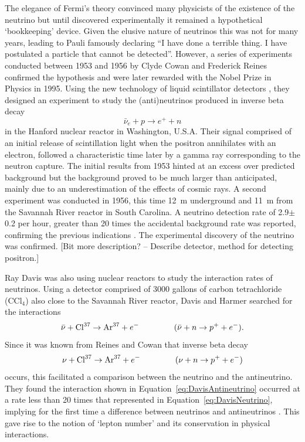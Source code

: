 The elegance of Fermi's theory convinced many physicists of the existence of the neutrino but until discovered experimentally it remained a hypothetical `bookkeeping' device.  Given the elusive nature of neutrinos this was not for many years, leading to Pauli famously declaring ``I have done a terrible thing. I have postulated a particle that cannot be detected''.  However, a series of experiments conducted between 1953 and 1956 by Clyde Cowan and Frederick Reines confirmed the hypothesis and were later rewarded with the Nobel Prize in Physics in 1995.  Using the new technology of liquid scintillator detectors \cite{ReinesCowanLiquidScintillation}, they designed an experiment \cite{ReinesCowan1953Proposal} to study the (anti)neutrinos produced in inverse beta decay
\begin{equation}\label{eq:InverseBetaDecay}
  {\bar{\nu}}_e + p \rightarrow e^+ + n
\end{equation}
in the Hanford nuclear reactor in Washington, U.S.A.  Their signal comprised of an initial release of scintillation light when the positron annihilates with an electron, followed a characteristic time later by a gamma ray corresponding to the neutron capture.  The initial results from 1953 \cite{ReinesCowan1953} hinted at an excess over predicted background but the background proved to be much larger than anticipated, mainly due to an underestimation of the effects of cosmic rays.  A second experiment was conducted in 1956, this time 12~m underground and 11~m from the Savannah River reactor in South Carolina.  A neutrino detection rate of 2.9$\pm$0.2 per hour, greater than 20 times the accidental background rate was reported, confirming the previous indications \cite{ReinesCowan1956}.  The experimental discovery of the neutrino was confirmed.  [Bit more description? -- Describe detector, method for detecting positron.]

Ray Davis was also using nuclear reactors to study the interaction rates of neutrinos.  Using a detector comprised of 3000 gallons of carbon tetrachloride (CCl$_4$) also close to the Savannah River reactor, Davis and Harmer searched for the interactions
\begin{equation}\label{eq:DavisAntineutrino}
  \bar{\nu} + \textnormal{Cl}^{37} \rightarrow \textnormal{Ar}^{37} + e^- \hspace{1.5cm} (\bar{\nu} + n \rightarrow p^+ + e^-).
\end{equation}
Since it was known from Reines and Cowan that inverse beta decay
\begin{equation}\label{eq:DavisNeutrino}
  \nu + \textnormal{Cl}^{37} \rightarrow \textnormal{Ar}^{37} + e^- \hspace{1.5cm} (\nu + n \rightarrow p^+ + e^-)
\end{equation}
occurs, this facilitated a comparison between the neutrino and the antineutrino.  They found the interaction shown in Equation~\ref{eq:DavisAntineutrino} occurred at a rate less than 20 times that represented in Equation~\ref{eq:DavisNeutrino}, implying for the first time a difference between neutrinos and antineutrinos \cite{Davis1959}.  This gave rise to the notion of `lepton number' and its conservation in physical interactions.

